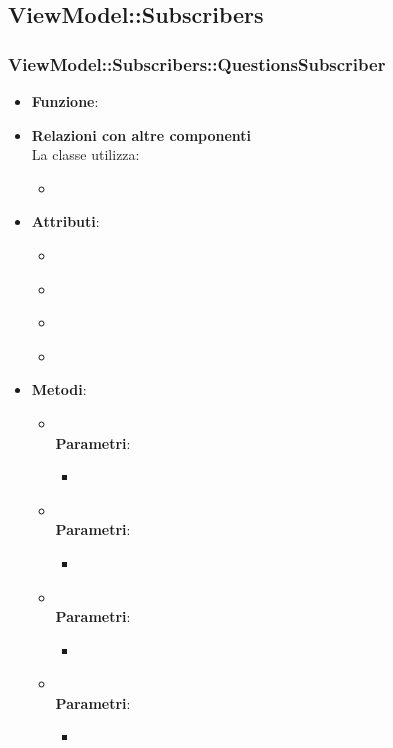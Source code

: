 \subsection{ViewModel::Subscribers}
\subsubsection{ViewModel::Subscribers::QuestionsSubscriber}
\begin{itemize}
\item\textbf{Funzione}:
\item\textbf{Relazioni con altre componenti}\\
La classe utilizza:
	\begin{itemize}
		\item
	\end{itemize}
\item\textbf{Attributi}:
	\begin{itemize}
		\item\code{}\\
		\item\code{}\\
		\item\code{}\\
		\item\code{}\\
	\end{itemize}
\item\textbf{Metodi}:
	\begin{itemize}
		\item\code{}\\
		\textbf{Parametri}:
			\begin{itemize}
				\item\code{}\\
			\end{itemize}
		\item\code{}\\
		\textbf{Parametri}:
			\begin{itemize}
				\item\code{}\\
			\end{itemize}
		\item\code{}\\
		\textbf{Parametri}:
			\begin{itemize}
				\item\code{}\\
			\end{itemize}
		\item\code{}\\
		\textbf{Parametri}:
			\begin{itemize}
				\item\code{}\\
			\end{itemize}
	\end{itemize}
\end{itemize}

